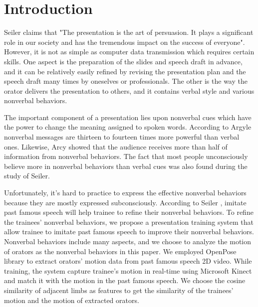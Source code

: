 \chapter{Introduction}
\par Seiler claims that "The presentation is the art of persuasion. It plays a significant role in our society and has the tremendous impact on the success of everyone"\cite{seiler2002communication}. However, it is not as simple as computer data transmission which requires certain skills\cite{rosenberg2005acoustic}. One aspect is the preparation of the slides and speech draft in advance, and it can be relatively easily refined by revising the presentation plan and the speech draft many times by oneselves or professionals. The other is the way the orator delivers the presentation to others, and it contains verbal style and various nonverbal behaviors. 
\par The important component of a presentation lies upon nonverbal cues which have the power to change the meaning assigned to spoken words\cite{seiler2002communication}. According to Argyle nonverbal messages are thirteen to fourteen times more powerful than verbal ones\cite{argyle1971communication}. Likewise, Arcy showed that the audience receives more than half of information from nonverbal behaviors\cite{d1998communicating}.  The fact that most people unconsciously believe more in nonverbal behaviors than verbal cues was also found during the study of Seiler\cite{seiler2002communication}.
\par Unfortunately, it's hard to practice to express the effective nonverbal behaviors because they are mostly expressed subconsciously. According to Seiler \cite{seiler2002communication}, imitate past famous speech will help trainee to refine their nonverbal behaviors. To refine the trainees' nonverbal behaviors, we propose a presentation training system that allow trainee to imitate past famous speech to improve their nonverbal behaviors. Nonverbal behaviors include many aspects, and we choose to analyze the motion of orators as the nonverbal behaviors in this paper. We employed OpenPose library\cite{cao2017realtime} to extract orators' motion data from past famous speech 2D video. While training, the system capture trainee's motion in real-time using Microsoft Kinect and match it with the motion in the past famous speech. We choose the cosine similarity of adjacent limbs as features to get the similarity of the trainees' motion and the motion of extracted orators.


